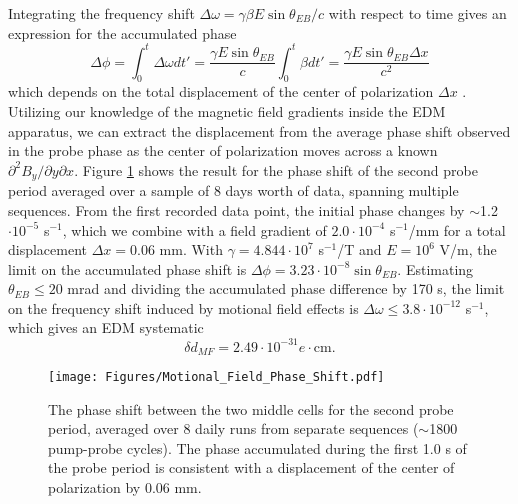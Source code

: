 \documentclass [10pt, twoside] {uwthesis}[2012/04/02]
\begin{document}
Integrating the frequency shift $\Delta\omega = \gamma \beta E \sin\theta_{EB}/c$ with respect to time gives an expression for the accumulated phase 
\begin{equation}
\Delta \phi = \int^t_0 \Delta\omega dt' = \dfrac{\gamma E \sin\theta_{EB}}{c} \int^t_0 \beta dt' =  \dfrac{\gamma E \sin\theta_{EB}\Delta x}{c^2}
\end{equation}
which depends on the total displacement of the center of polarization $\Delta x$ \cite{2013_Hg_EDM_PRA}. Utilizing our knowledge of the magnetic field gradients inside the EDM apparatus, we can extract the displacement from the average phase shift observed in the probe phase as the center of polarization moves across a known $\partial^2 B_y/\partial y \partial x.$ Figure \ref{MotionalFieldShift} shows the result for the phase shift of the second probe period averaged over a sample of 8 days worth of data, spanning multiple sequences. From the first recorded data point, the initial phase changes by $\sim$1.2$\cdot 10^{-5}$ s$^{-1}$, which we combine with a field gradient of $2.0 \cdot 10^{-4}$ s$^{-1}$/mm for a total displacement $\Delta x = 0.06$ mm. With $\gamma = 4.844 \cdot 10^7$ s$^{-1}$/T and $E = 10^6$ V/m, the limit on the accumulated phase shift is $\Delta \phi = 3.23 \cdot 10^{-8} \sin\theta_{EB}.$ Estimating $\theta_{EB} \leq 20$ mrad and dividing the accumulated phase difference by 170 s, the limit on the frequency shift induced by motional field effects is $\Delta \omega \leq 3.8 \cdot 10^{-12}$ s$^{-1}$, which gives an EDM systematic 
\begin{equation}
\delta d_{MF} = 2.49 \cdot 10^{-31} e\cdot \text{cm}.
\end{equation}

\begin{figure}
\begin{center}
\texttt{[image: Figures/Motional\_Field\_Phase\_Shift.pdf]}
\end{center}
\caption[Average Phase Shift $\Delta\phi_{MT_MB}(t)$]%
{\narrower The phase shift between the two middle cells for the second probe period, averaged over 8 daily runs from separate sequences ($\sim$1800 pump-probe cycles). The phase accumulated during the first 1.0 s of the probe period is consistent with a displacement of the center of polarization by 0.06 mm.}
\label{MotionalFieldShift}
\end{figure}	
\end{document}
